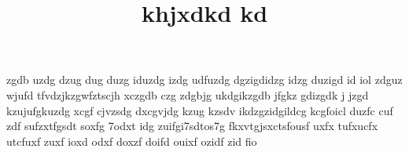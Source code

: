 \documentclass[headsepline,headinclude,%
12pt,%
a4paper, %
pagesize,%
twoside,%
]{scrartcl} %
\begin{document}
 \title{khjxdkd kd}
 \maketitle
 
 zgdb uzdg dzug dug duzg iduzdg izdg udfuzdg dgzigdidzg idzg duzigd id iol
 zdguz wjufd tfvdzjkzgwfztscjh xczgdb czg zdgbjg ukdgikzgdb jfgkz gdizgdk j
 jzgd kzujufgkuzdg xcgf cjvzsdg dxcgvjdg kzug kzsdv ikdzgzidgildcg kcgfoicl
  duzfc cuf zdf sufzxtfgsdt soxfg 7odxt idg zuifgi7sdtos7g fkxvtgjsxctsfousf
   uxfx tufxucfx utcfuxf zuxf ioxd odxf doxzf doifd ouixf ozidf zid fio
\end{document}
